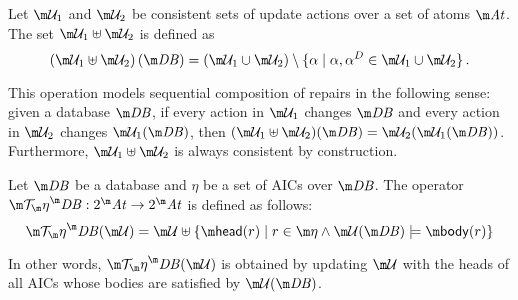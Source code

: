 \begin{definition}
  Let $\UU_1$ and $\UU_2$ be consistent sets of update actions over a set of atoms $\atoms$.
  The set $\UU_1\uplus\UU_2$ is defined as
  \[\left(\UU_1\uplus \UU_2\right)(\db) = \left(\UU_1\cup \UU_2\right) \setminus \{\alpha \mid \alpha,\alpha^D\in \UU_1\cup\UU_2\}\,.\]
\end{definition}
This operation models sequential composition of repairs in the following sense: given a database $\db$, if every action in $\UU_1$ changes $\db$ and every action in $\UU_2$ changes $\UU_1(\db)$, then $(\UU_1\uplus\UU_2)(\db)=\UU_2(\UU_1(\db))$.
% 
% 
% 
Furthermore, $\UU_1\uplus\UU_2$ is always consistent by construction.
%
\begin{definition}
  Let $\db$ be a database and $\eta$ be a set of AICs over $\db$.
  The operator $\Op^\db:2^\atoms\to 2^\atoms$ is defined as follows:
  \[
    \Op^\db(\UU) = \UU\uplus\{\head(r)\mid r\in \aics \land \UU(\db)\models\body(r)\}
  \]
\end{definition}
In other words, $\Op^\db(\UU)$ is obtained by updating $\UU$ with the heads of all AICs whose bodies are satisfied by $\UU(\db)$.

